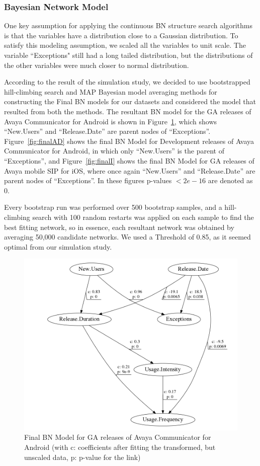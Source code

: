\documentclass[smallcondensed]{svjour3}     %
\begin{document}
\subsubsection{Bayesian Network Model}
One key assumption for applying the continuous BN structure search algorithms 
is that the variables have a distribution close to a Gaussian distribution.
To satisfy this modeling assumption, we scaled all the
variables to unit scale. The variable ``Exceptions" still had a long
tailed distribution, but the distributions of the other variables
were much closer to normal distribution.

According to the result of the simulation study, we decided to use bootstrapped hill-climbing search and MAP Bayesian model averaging methods for constructing the Final BN models for our datasets and considered the model that resulted from both the methods. 
The resultant BN model for the GA releases of Avaya Communicator for Android is shown in Figure~\ref{fig:finalAGA}, which shows ``New.Users'' and ``Release.Date'' are parent nodes of ``Exceptions''.  Figure~\ref{fig:finalAD} shows the final BN Model for Development releases of Avaya Communicator for Android, in which only ``New.Users'' is the parent of ``Exceptions'', and Figure~\ref{fig:finalI} shows the final BN Model for GA releases of Avaya mobile SIP for iOS, where once again ``New.Users'' and ``Release.Date'' are parent nodes of ``Exceptions''. In these figures p-values $< 2e-16$ are denoted as 0. 

Every bootstrap run was performed over 500 bootstrap samples, and a
hill-climbing search  with 100 random restarts was applied on each sample 
to find the best fitting network, so in essence, each resultant network was 
obtained by averaging 50,000 candidate networks. We used a Threshold of 
0.85, as it seemed optimal from our simulation study.

\begin{figure}[!t]
\centering
\includegraphics[width=0.7\linewidth]{AGA}%
\caption{Final BN Model for GA releases of Avaya Communicator for Android (with c: coefficients after fitting the transformed, but unscaled data, p: p-value  for the link) }
\label{fig:finalAGA}
\vspace{-10pt}
\end{figure}
\end{document}
